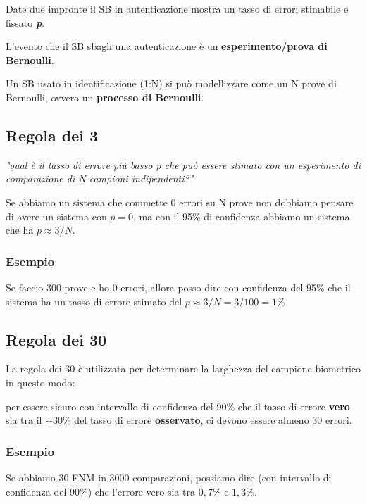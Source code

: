 Date due impronte il SB in autenticazione mostra un tasso di errori stimabile e fissato \textit{\textbf{p}}.

L'evento che il SB sbagli una autenticazione è un \textbf{esperimento/prova di Bernoulli}.

Un SB usato in identificazione (1:N) si può modellizzare come un N prove di Bernoulli, 
ovvero un \textbf{processo di Bernoulli}.

\subsection{Regola dei 3}

\textit{"qual è il tasso di errore più basso p che può essere stimato con un esperimento
di comparazione di N campioni indipendenti?"}

Se abbiamo un sistema che commette 0 errori su N prove non dobbiamo pensare di
avere un sistema con $p=0$, ma con il 95\% di confidenza abbiamo un sistema
che ha $p \approx 3/N$.

\subsubsection{Esempio}

Se faccio 300 prove e ho 0 errori, allora posso dire con confidenza del 95\% che
il sistema ha un tasso di errore stimato del $p \approx 3/N = 3/100 = 1\%$

\subsection{Regola dei 30}

La regola dei 30 è utilizzata per determinare la larghezza del campione biometrico in questo modo:

per essere sicuro con intervallo di confidenza del 90\% che il tasso di errore \textbf{vero}
sia tra il $\pm 30 \%$ del tasso di errore \textbf{osservato}, ci devono essere almeno 30 errori.

\subsubsection{Esempio}
Se abbiamo 30 FNM in 3000 comparazioni, possiamo dire (con intervallo di 
confidenza del 90\%) che l'errore vero sia tra $0,7\%$ e $1,3\%$.